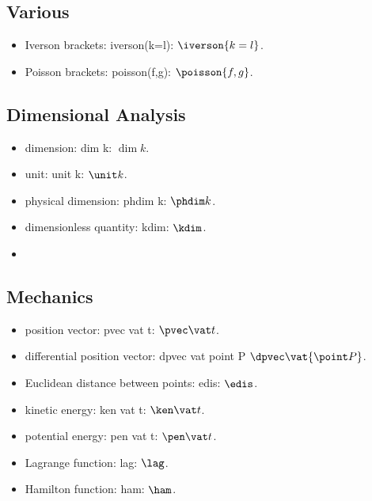 \begin{multicols}{2}
\subsection{Various}
\begin{itemize}
\item Iverson brackets: iverson(k=l): $\iverson{k=l}$.
\item Poisson brackets: poisson(f,g): $\poisson{f,g}$.
\end{itemize}


\subsection{Dimensional Analysis}
\begin{itemize}
\item dimension: dim k: $\dim k$.
\item unit: unit k: $\unit k$.
\item physical dimension: phdim k: $\phdim k$.
\item dimensionless quantity: kdim: $\kdim$.
\item 
\end{itemize}


\subsection{Mechanics}
\begin{itemize}
\item position vector: pvec vat t: $\pvec\vat t$.
\item differential position vector: dpvec vat point P $\dpvec\vat{\point P}$.
\item Euclidean distance between points: edis: $\edis$.
\item kinetic energy: ken vat t: $\ken\vat t$.
\item potential energy: pen vat t: $\pen\vat t$.
\item Lagrange function: lag: $\lag$.
\item Hamilton function: ham: $\ham$.
\end{itemize}
\end{multicols}
